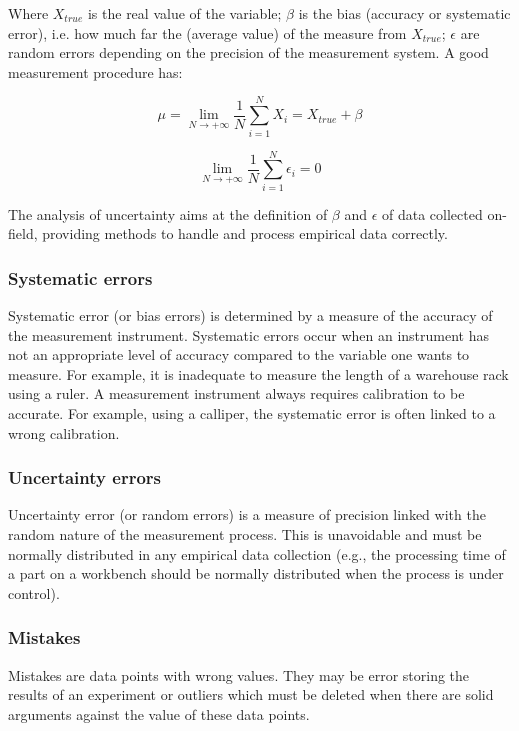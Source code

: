 Where $X_{true}$ is the real value of the variable; $\beta$ is the bias (accuracy or systematic error), i.e. how much far the (average value) of the measure from $X_{true}$; $\epsilon$ are random errors depending on the precision of the measurement system. A good measurement procedure has:

\begin{equation}
\mu=\lim_{N \to +\infty}{\frac{1}{N}\sum_{i=1}^{N}{X_i=X_{true}+\beta}}
\label{eq_measurement2}
\end{equation}

\begin{equation}
\lim_{N \to +\infty}{\frac{1}{N}\sum_{i=1}^{N}{\epsilon_i=0}}
\label{eq_measurement3}
\end{equation}

The analysis of uncertainty aims at the definition of $\beta$ and $\epsilon$ of data collected on-field, providing methods to handle and process empirical data correctly.

\subsubsection{Systematic errors}
Systematic error (or bias errors) is determined by a measure of the accuracy of the measurement instrument. Systematic errors occur when an instrument has not an appropriate level of accuracy compared to the variable one wants to measure. For example, it is inadequate to measure the length of a warehouse rack using a ruler. A measurement instrument always requires calibration to be accurate. For example, using a calliper, the systematic error is often linked to a wrong calibration. 

\subsubsection{Uncertainty errors}
Uncertainty error (or random errors) is a measure of precision linked with the random nature of the measurement process. This is unavoidable and must be normally distributed in any empirical data collection (e.g., the processing time of a part on a workbench should be normally distributed when the process is under control).

\subsubsection{Mistakes}
Mistakes are data points with wrong values. They may be error storing the results of an experiment or outliers which must be deleted when there are solid arguments against the value of these data points.

